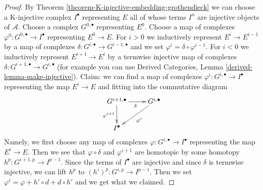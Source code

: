 \documentclass[10pt,a4paper]{amsart}
\theoremstyle{plain}
\theoremstyle{definition}
\theoremstyle{remark}
\numberwithin{equation}{subsection}
\begin{document}
\begin{proof}
By Theorem \ref{theorem-K-injective-embedding-grothendieck}
we can choose a K-injective complex $I^\bullet$
representing $E$ all of whose terms $I^n$ are injective
objects of $\mathcal{A}$.
Choose a complex $G^{0, \bullet}$ representing $E^0$.
Choose a map of complexes $\varphi^0 : G^{0, \bullet} \to I^\bullet$
representing $E^0 \to E$.
For $i > 0$ we inductively represent $E^i \to E^{i - 1}$
by a map of complexes
$\delta : G^{i, \bullet} \to G^{i - 1, \bullet}$
and we set $\varphi^i = \delta \circ \varphi^{i - 1}$.
For $i < 0$ we inductively represent $E^{i + 1} \to E^i$
by a termwise injective map of complexes
$\delta : G^{i + 1, \bullet} \to G^{i, \bullet}$
(for example you can use
Derived Categories, Lemma \ref{derived-lemma-make-injective}).
Claim: we can find a map of complexes
$\varphi^i : G^{i, \bullet} \to I^\bullet$
representing the map $E^i \to E$ and
fitting into the commutative diagram
$$
\xymatrix{
G^{i + 1, \bullet} \ar[r]_\delta \ar[d]_{\varphi^{i + 1}} &
G^{i, \bullet} \ar[ld]^{\varphi^i} \\
I^\bullet
}
$$
Namely, we first choose any map of complexes
$\varphi : G^{i, \bullet} \to I^\bullet$
representing the map
$E^i \to E$. Then we see that $\varphi \circ \delta$
and $\varphi^{i + 1}$ are homotopic by some homotopy
$h^p : G^{i + 1, p} \to I^{p - 1}$.
Since the terms of
$I^\bullet$ are injective and since $\delta$
is termwise injective, we can lift $h^p$ to
$(h')^p : G^{i, p} \to I^{p - 1}$.
Then we set $\varphi^i = \varphi + h' \circ d + d \circ h'$
and we get what we claimed.


\end{proof}
\end{document}
